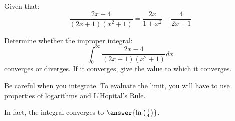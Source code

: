 \documentclass{ximera}
\author{Jim Talamo}
\begin{document}
\begin{exercise}
Given that: 
\[ \frac{2x-4}{(2x+1)(x^2+1)} = \dfrac{2x}{1+x^2}-\dfrac{4}{2x+1} \]

Determine whether the improper integral:
\[ \displaystyle \int_0^{\infty}\frac{2x-4}{(2x+1)(x^2+1)} dx \]
 converges or diverges.  If it converges, give the value to which it converges.  

\begin{multipleChoice}
\end{multipleChoice}

\begin{hint}
Be careful when you integrate.  To evaluate the limit, you will have to use properties of logarithms and L'Hopital's Rule.
\end{hint}

\begin{exercise}
In fact, the integral converges to $\answer{ \ln\left(\frac{1}{4}\right) }$.
\end{exercise}
\end{exercise}
\end{document}

